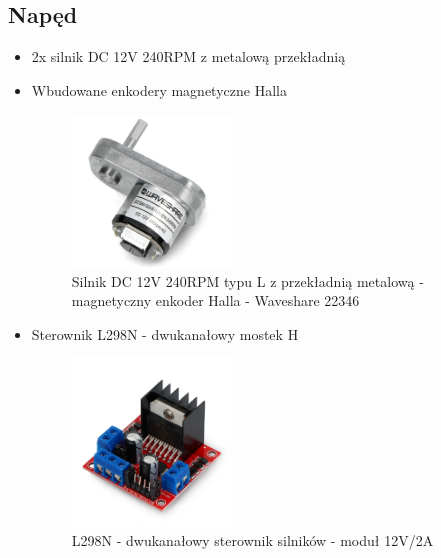\documentclass[a4paper,twoside,12pt]{book}
\begin{document}
\subsection{Napęd}
\begin{itemize}
\item 2x silnik DC 12V 240RPM z metalową przekładnią
\item Wbudowane enkodery magnetyczne Halla
\begin{figure}
	\centering
	\includegraphics[width=0.4\textwidth]{images/sil.png}
	\caption{Silnik DC 12V 240RPM typu L z przekładnią metalową - magnetyczny enkoder Halla - Waveshare 22346}
	\label{fig:silnik}
	\end{figure}
\item Sterownik L298N - dwukanałowy mostek H \newline
\begin{figure}
	\centering
	\includegraphics[width=0.4\textwidth]{images/ster.png}
	\caption{L298N - dwukanałowy sterownik silników - moduł 12V/2A}
	\label{fig:ster}
	\end{figure}
\end{itemize}
\end{document}
